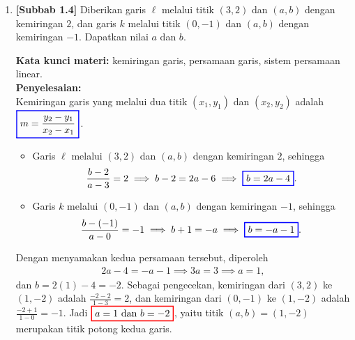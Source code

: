 \documentclass[10pt,openany,a4paper]{article}
\theoremstyle{definition}
\theoremstyle{definition}
\theoremstyle{plain}
\newenvironment{jawab}[2][tes]{%
\par\noindent\textbf{Kata kunci materi:} #1.\\
\textbf{Penyelesaian:} #2%
}{}
\begin{document}
\newpage

\begin{enumerate}
    \item \textbf{[Subbab 1.4]} Diberikan garis $\ell$ melalui titik $(3,2)$ dan $(a,b)$ dengan kemiringan $2$, dan garis $k$ melalui titik $(0,-1)$ dan $(a,b)$ dengan kemiringan $-1$. Dapatkan nilai $a$ dan $b$.
    \begin{jawab}[kemiringan garis, persamaan garis, sistem persamaan linear]{~\\
        Kemiringan garis yang melalui dua titik $(x_1,y_1)$ dan $(x_2,y_2)$ adalah $\colorlet{oldcolor}{.}
        \color{blue}
        \setlength{\fboxrule}{1pt} \boxed{\color{oldcolor}m = \frac{y_2 - y_1}{x_2 - x_1}}\color{oldcolor}$.
        \begin{itemize}
            \item Garis $\ell$ melalui $(3,2)$ dan $(a,b)$ dengan kemiringan $2$, sehingga
            \begin{align*}
                \frac{b-2}{a-3} = 2 \implies b-2 = 2a-6 \implies \colorlet{oldcolor}{.}
        \color{blue}
        \setlength{\fboxrule}{1pt} \boxed{\color{oldcolor}b = 2a-4}\color{oldcolor}.
            \end{align*}
            \item Garis $k$ melalui $(0,-1)$ dan $(a,b)$ dengan kemiringan $-1$, sehingga
            \begin{align*}
                \frac{b-(-1)}{a-0} = -1 \implies b+1 = -a \implies \colorlet{oldcolor}{.}
        \color{blue}
        \setlength{\fboxrule}{1pt} \boxed{\color{oldcolor}b = -a-1}\color{oldcolor}.
            \end{align*}
        \end{itemize}
        Dengan menyamakan kedua persamaan tersebut, diperoleh
        \begin{align*}
            2a-4 = -a-1 \implies 3a = 3 \implies a = 1,
        \end{align*}
        dan $b=2(1)-4=-2$. Sebagai pengecekan, kemiringan dari $(3,2)$ ke $(1,-2)$ adalah $\frac{-2-2}{1-3}=2$, dan kemiringan dari $(0,-1)$ ke $(1,-2)$ adalah $\frac{-2+1}{1-0}=-1$. Jadi $\colorlet{oldcolor}{.}
        \color{red}
        \setlength{\fboxrule}{1pt} \boxed{\color{oldcolor}a=1 \text{ dan } b=-2}\color{oldcolor}$, yaitu titik $(a,b)=(1,-2)$ merupakan titik potong kedua garis.
    }
    \end{jawab}


\end{enumerate}
\end{document}
